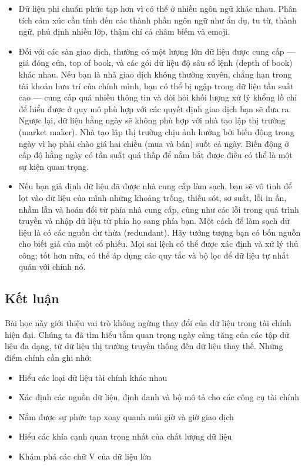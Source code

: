 \begin{itemize}
  \item Dữ liệu phi chuẩn phức tạp hơn vì có thể ở nhiều ngôn ngữ khác nhau. Phân tích cảm xúc cần tính đến các thành phần ngôn ngữ như ẩn dụ, tu từ, thành ngữ, phủ định nhiều lớp, thậm chí cả châm biếm và emoji.
  \item Đối với các sàn giao dịch, thường có một lượng lớn dữ liệu được cung cấp — giá đóng cửa, top of book, và các gói dữ liệu độ sâu sổ lệnh (depth of book) khác nhau. Nếu bạn là nhà giao dịch không thường xuyên, chẳng hạn trong tài khoản hưu trí của chính mình, bạn có thể bị ngập trong dữ liệu tần suất cao — cung cấp quá nhiều thông tin và đòi hỏi khối lượng xử lý khổng lồ chỉ để hiểu được ở quy mô phù hợp với các quyết định giao dịch bạn sẽ đưa ra. Ngược lại, dữ liệu hằng ngày sẽ không phù hợp với nhà tạo lập thị trường (market maker). Nhà tạo lập thị trường chịu ảnh hưởng bởi biến động trong ngày vì họ phải chào giá hai chiều (mua và bán) suốt cả ngày. Biến động ở cấp độ hằng ngày có tần suất quá thấp để nắm bắt được điều có thể là một sự kiện quan trọng.
  \item Nếu bạn giả định dữ liệu đã được nhà cung cấp làm sạch, bạn sẽ vô tình để lọt vào dữ liệu của mình những khoảng trống, thiếu sót, sơ suất, lỗi in ấn, nhầm lẫn và hoán đổi từ phía nhà cung cấp, cũng như các lỗi trong quá trình truyền và nhập dữ liệu từ phía họ sang phía bạn. Một cách để làm sạch dữ liệu là có các nguồn dư thừa (redundant). Hãy tưởng tượng bạn có bốn nguồn cho biết giá của một cổ phiếu. Mọi sai lệch có thể được xác định và xử lý thủ công; tốt hơn nữa, có thể áp dụng các quy tắc và bộ lọc để dữ liệu tự nhất quán với chính nó.
\end{itemize}

\subsection{Kết luận}

Bài học này giới thiệu vai trò không ngừng thay đổi của dữ liệu trong tài chính hiện đại. Chúng ta đã tìm hiểu tầm quan trọng ngày càng tăng của các tập dữ liệu đa dạng, từ dữ liệu thị trường truyền thống đến dữ liệu thay thế. Những điểm chính cần ghi nhớ:

\begin{itemize}
  \item Hiểu các loại dữ liệu tài chính khác nhau
  \item Xác định các nguồn dữ liệu, định danh và bộ mô tả cho các công cụ tài chính
  \item Nắm được sự phức tạp xoay quanh múi giờ và giờ giao dịch
  \item Hiểu các khía cạnh quan trọng nhất của chất lượng dữ liệu
  \item Khám phá các chữ V của dữ liệu lớn
\end{itemize}

